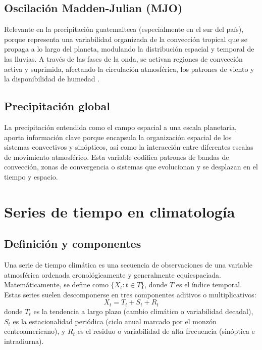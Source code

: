 \subsection{Oscilación Madden-Julian (MJO)} 

Relevante en la precipitación guatemalteca (especialmente en el sur del país), porque representa una variabilidad organizada de la convección tropical que se propaga a lo largo del planeta, modulando la distribución espacial y temporal de las lluvias. A través de las fases de la onda, se activan regiones de convección activa y suprimida, afectando la circulación atmosférica, los patrones de viento y la disponibilidad de humedad \citep{ramos2022influencia, marshall2015madden, zhang2005madden}.

\subsection{Precipitación global}

La precipitación entendida como el campo espacial a una escala planetaria, aporta información clave porque encapsula la organización espacial de los sistemas convectivos y sinópticos, así como la interacción entre diferentes escalas de movimiento atmosférico. Esta variable codifica patrones de bandas de convección, zonas de convergencia o sistemas que evolucionan y se desplazan en el tiempo y espacio.

\section{Series de tiempo en climatología}

\subsection{Definición y componentes}
Una serie de tiempo climática es una secuencia de observaciones de una variable atmosférica ordenada cronológicamente y generalmente equiespaciada. Matemáticamente, se define como \(\{X_t : t \in T\}\), donde \(T\) es el índice temporal. Estas series suelen descomponerse en tres componentes aditivos o multiplicativos:
\begin{equation}
    X_t = T_t + S_t + R_t
\end{equation}
donde \(T_t\) es la tendencia a largo plazo (cambio climático o variabilidad decadal), \(S_t\) es la estacionalidad periódica (ciclo anual marcado por el monzón centroamericano), y \(R_t\) es el residuo o variabilidad de alta frecuencia (sinóptica e intradiurna).

